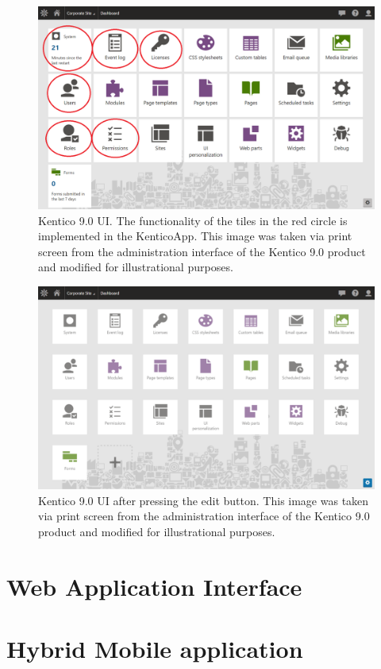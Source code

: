 \begin{figure}[ht!]
  \centering
  \includegraphics[width=\textwidth]{Images/Kentico9.png}
  \caption{Kentico 9.0 UI. The functionality of the tiles in the red circle is implemented in the KenticoApp. This image was
taken via print screen from the administration interface of the Kentico 9.0 product and modified for illustrational purposes.}
  \label{kentico9UI}
\end{figure} 

\begin{figure}[ht!]
  \centering
  \includegraphics[width=\textwidth]{Images/Kentico9EditBtnPressed.png}
  \caption{Kentico 9.0 UI after pressing the edit button. This image was
taken via print screen from the administration interface of the Kentico 9.0 product and modified for illustrational purposes.}
  \label{kentico9UIEditBtnPressed}
\end{figure} 
\section{Web Application Interface} \label{analysisWebAPI}
\section{Hybrid Mobile application} \label{analysisHybridMobileApplication}
